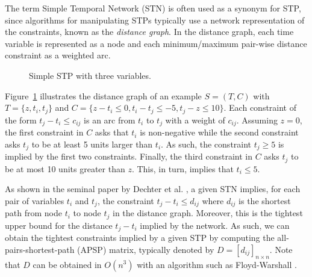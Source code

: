 	The term Simple Temporal Network (STN) is often used as a synonym for STP,
	since algorithms for manipulating STPs typically use a network representation of the constraints, known as the \emph{distance graph}.
	In the distance graph, each time variable is represented as a node and each minimum/maximum pair-wise distance constraint as a weighted arc.

	\begin{figure}
		\centering
		\caption{Simple STP with three variables.}
		\label{chapter:prelim-1:example-1}
	\end{figure}
	
	\begin{example}
		Figure~\ref{chapter:prelim-1:example-1} illustrates the distance graph of an example 
		$S=(T,C)$ with $T=\{z, t_i, t_j\}$ and $C=\{z - t_i  \leq 0, t_i - t_j  \leq -5, t_j - z \leq 10\}$.
		Each constraint of the form $t_j - t_i \leq c_{ij}$ is an arc from $t_i$ to $t_j$ with a weight of $c_{ij}$.
		Assuming $z = 0$, the first constraint in $C$ asks that $t_i$ is non-negative while
		the second constraint asks $t_j$ to be at least 5 units larger than $t_i$.
		As such, the constraint $t_j \geq 5$ is implied by the first two constraints.
		Finally, the third constraint in $C$ asks $t_j$ to be at most 10 units greater than $z$.
		This, in turn, implies that $t_i \leq 5$.
	\end{example}

	As shown in the seminal paper by Dechter et al. \cite{dechter1991}, a given STN implies,
	for each pair of variables $t_i$ and $t_j$,
	the constraint $t_j - t_i \leq d_{ij}$ where $d_{ij}$ is the shortest path from node $t_i$ to node $t_j$ in the distance graph.
	Moreover, this is the tightest upper bound for the distance $t_j - t_i$ implied by the network.
	As such, we can obtain the tightest constraints implied by a given STP by computing the
	all-pairs-shortest-path (APSP) matrix, typically denoted by $D=[d_{ij}]_{n\times n}$.
	Note that $D$ can be obtained in $O(n^3)$ with an algorithm such as Floyd-Warshall \cite{floyd:1962}.
	

